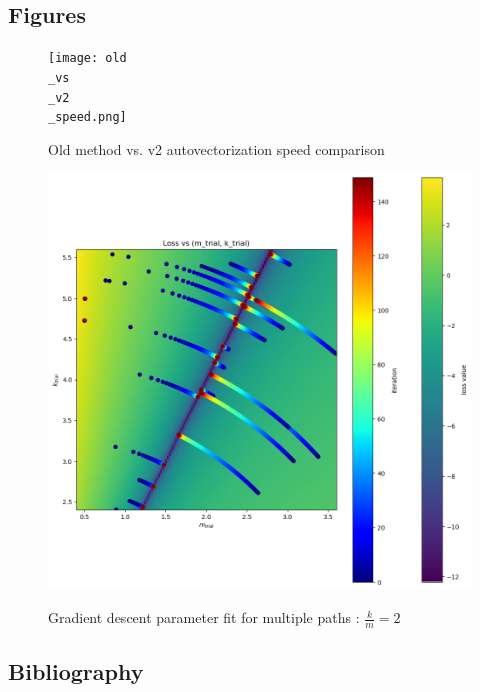 \documentclass[]{article}
\begin{document}
\newpage
\begin{appendices}
\section{Figures}
	\begin{figure}[h]
		\caption{Old method vs. v2 autovectorization speed comparison}
		\centering
		\texttt{[image: old\\\_vs\\\_v2\\\_speed.png]}
		\label{fig:speedup}
	\end{figure}
	
	\begin{figure}[H]
		\caption{Gradient descent parameter fit for multiple paths : $\frac{k}{m}=2$}
		\centering
		\includegraphics[scale=0.60]{parameter-paths.png}
		\label{fig:parameter-paths}
	\end{figure}
\end{appendices}



\newpage
\begin{appendices}
	\section{Bibliography}
	\printbibliography
\end{appendices}
\end{document}
